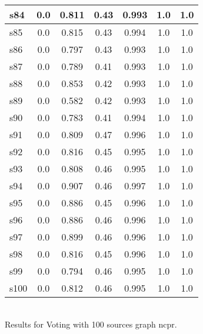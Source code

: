 \documentclass{article}
\begin{document}
\begin{tabular}{|l|c|c|c|c|c|c|}
\hline
s84 &0.0 & 0.811 & 0.43 & 0.993 & 1.0 & 1.0\\
\hline
s85 &0.0 & 0.815 & 0.43 & 0.994 & 1.0 & 1.0\\
\hline
s86 &0.0 & 0.797 & 0.43 & 0.993 & 1.0 & 1.0\\
\hline
s87 &0.0 & 0.789 & 0.41 & 0.993 & 1.0 & 1.0\\
\hline
s88 &0.0 & 0.853 & 0.42 & 0.993 & 1.0 & 1.0\\
\hline
s89 &0.0 & 0.582 & 0.42 & 0.993 & 1.0 & 1.0\\
\hline
s90 &0.0 & 0.783 & 0.41 & 0.994 & 1.0 & 1.0\\
\hline
s91 &0.0 & 0.809 & 0.47 & 0.996 & 1.0 & 1.0\\
\hline
s92 &0.0 & 0.816 & 0.45 & 0.995 & 1.0 & 1.0\\
\hline
s93 &0.0 & 0.808 & 0.46 & 0.995 & 1.0 & 1.0\\
\hline
s94 &0.0 & 0.907 & 0.46 & 0.997 & 1.0 & 1.0\\
\hline
s95 &0.0 & 0.886 & 0.45 & 0.996 & 1.0 & 1.0\\
\hline
s96 &0.0 & 0.886 & 0.46 & 0.996 & 1.0 & 1.0\\
\hline
s97 &0.0 & 0.899 & 0.46 & 0.996 & 1.0 & 1.0\\
\hline
s98 &0.0 & 0.816 & 0.45 & 0.996 & 1.0 & 1.0\\
\hline
s99 &0.0 & 0.794 & 0.46 & 0.995 & 1.0 & 1.0\\
\hline
s100 &0.0 & 0.812 & 0.46 & 0.995 & 1.0 & 1.0\\
\hline
\end{tabular}\\

\noindent Results for Voting with 100 sources graph ncpr.
\end{document}
